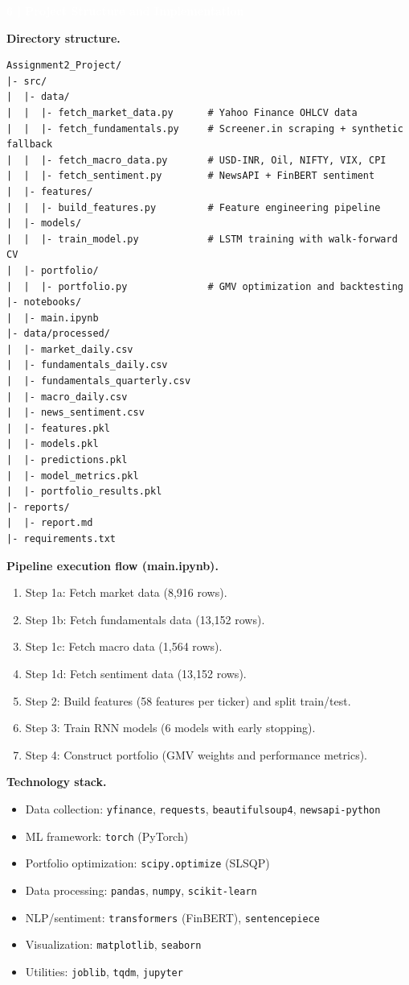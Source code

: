 \documentclass[10pt,a4paper]{article}
\newcommand{\SectionBar}[1]{%
  \vspace{0.35em}
  \noindent\colorbox{ReportBlue}{%
    \parbox{\dimexpr\linewidth-2\fboxsep\relax}{%
      \vspace{2.5pt}\textcolor{white}{\bfseries\footnotesize #1}\vspace{2.5pt}
    }%
  }%
  \vspace{0.35em}
}
\begin{document}
\SectionBar{6 \;|\; Project Structure and Implementation}
{\fontsize{8}{10.3}\selectfont\justifying
\textbf{Directory structure.}
\begin{verbatim}
Assignment2_Project/
|- src/
|  |- data/
|  |  |- fetch_market_data.py      # Yahoo Finance OHLCV data
|  |  |- fetch_fundamentals.py     # Screener.in scraping + synthetic fallback
|  |  |- fetch_macro_data.py       # USD-INR, Oil, NIFTY, VIX, CPI
|  |  |- fetch_sentiment.py        # NewsAPI + FinBERT sentiment
|  |- features/
|  |  |- build_features.py         # Feature engineering pipeline
|  |- models/
|  |  |- train_model.py            # LSTM training with walk-forward CV
|  |- portfolio/
|  |  |- portfolio.py              # GMV optimization and backtesting
|- notebooks/
|  |- main.ipynb
|- data/processed/
|  |- market_daily.csv
|  |- fundamentals_daily.csv
|  |- fundamentals_quarterly.csv
|  |- macro_daily.csv
|  |- news_sentiment.csv
|  |- features.pkl
|  |- models.pkl
|  |- predictions.pkl
|  |- model_metrics.pkl
|  |- portfolio_results.pkl
|- reports/
|  |- report.md
|- requirements.txt
\end{verbatim}

\textbf{Pipeline execution flow (main.ipynb).}
\begin{enumerate}
  \item Step 1a: Fetch market data (8,916 rows).
  \item Step 1b: Fetch fundamentals data (13,152 rows).
  \item Step 1c: Fetch macro data (1,564 rows).
  \item Step 1d: Fetch sentiment data (13,152 rows).
  \item Step 2: Build features (58 features per ticker) and split train/test.
  \item Step 3: Train RNN models (6 models with early stopping).
  \item Step 4: Construct portfolio (GMV weights and performance metrics).
\end{enumerate}

\textbf{Technology stack.}
\begin{itemize}
  \item Data collection: \texttt{yfinance}, \texttt{requests}, \texttt{beautifulsoup4}, \texttt{newsapi-python}
  \item ML framework: \texttt{torch} (PyTorch)
  \item Portfolio optimization: \texttt{scipy.optimize} (SLSQP)
  \item Data processing: \texttt{pandas}, \texttt{numpy}, \texttt{scikit-learn}
  \item NLP/sentiment: \texttt{transformers} (FinBERT), \texttt{sentencepiece}
  \item Visualization: \texttt{matplotlib}, \texttt{seaborn}
  \item Utilities: \texttt{joblib}, \texttt{tqdm}, \texttt{jupyter}
\end{itemize}

}
\end{document}
